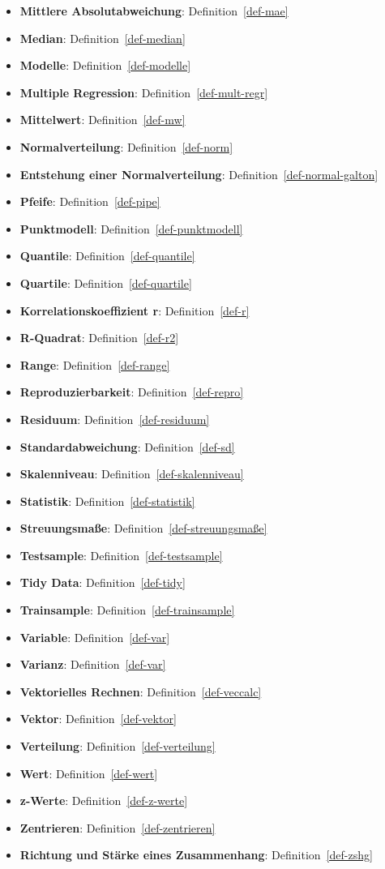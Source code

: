\documentclass[
  letterpaper,
  oneside,
  open=any]{scrbook}
\theoremstyle{definition}
\theoremstyle{definition}
\theoremstyle{definition}
\theoremstyle{remark}
\begin{document}
\begin{itemize}
\item
  \textbf{Mittlere Absolutabweichung}: Definition~\ref{def-mae}
\item
  \textbf{Median}: Definition~\ref{def-median}
\item
  \textbf{Modelle}: Definition~\ref{def-modelle}
\item
  \textbf{Multiple Regression}: Definition~\ref{def-mult-regr}
\item
  \textbf{Mittelwert}: Definition~\ref{def-mw}
\item
  \textbf{Normalverteilung}: Definition~\ref{def-norm}
\item
  \textbf{Entstehung einer Normalverteilung}:
  Definition~\ref{def-normal-galton}
\item
  \textbf{Pfeife}: Definition~\ref{def-pipe}
\item
  \textbf{Punktmodell}: Definition~\ref{def-punktmodell}
\item
  \textbf{Quantile}: Definition~\ref{def-quantile}
\item
  \textbf{Quartile}: Definition~\ref{def-quartile}
\item
  \textbf{Korrelationskoeffizient r}: Definition~\ref{def-r}
\item
  \textbf{R-Quadrat}: Definition~\ref{def-r2}
\item
  \textbf{Range}: Definition~\ref{def-range}
\item
  \textbf{Reproduzierbarkeit}: Definition~\ref{def-repro}
\item
  \textbf{Residuum}: Definition~\ref{def-residuum}
\item
  \textbf{Standardabweichung}: Definition~\ref{def-sd}
\item
  \textbf{Skalenniveau}: Definition~\ref{def-skalenniveau}
\item
  \textbf{Statistik}: Definition~\ref{def-statistik}
\item
  \textbf{Streuungsmaße}: Definition~\ref{def-streuungsmaße}
\item
  \textbf{Testsample}: Definition~\ref{def-testsample}
\item
  \textbf{Tidy Data}: Definition~\ref{def-tidy}
\item
  \textbf{Trainsample}: Definition~\ref{def-trainsample}
\item
  \textbf{Variable}: Definition~\ref{def-var}
\item
  \textbf{Varianz}: Definition~\ref{def-var}
\item
  \textbf{Vektorielles Rechnen}: Definition~\ref{def-veccalc}
\item
  \textbf{Vektor}: Definition~\ref{def-vektor}
\item
  \textbf{Verteilung}: Definition~\ref{def-verteilung}
\item
  \textbf{Wert}: Definition~\ref{def-wert}
\item
  \textbf{z-Werte}: Definition~\ref{def-z-werte}
\item
  \textbf{Zentrieren}: Definition~\ref{def-zentrieren}
\item
  \textbf{Richtung und Stärke eines Zusammenhang}:
  Definition~\ref{def-zshg}
\end{itemize}
\end{document}
